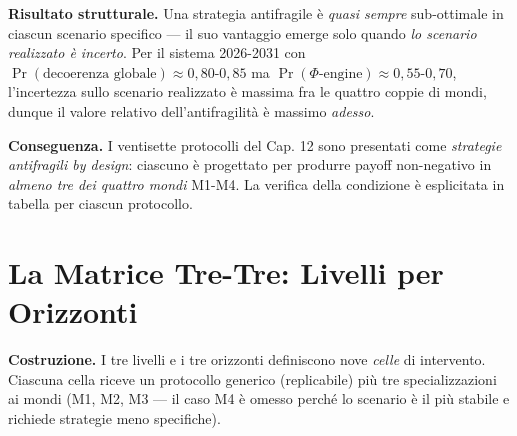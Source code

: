 \Proved{} \textbf{Risultato strutturale.} Una strategia antifragile è
\emph{quasi sempre} sub-ottimale in ciascun scenario specifico --- il
suo vantaggio emerge solo quando \emph{lo scenario realizzato è
incerto}. Per il sistema 2026-2031 con
\(\Pr(\text{decoerenza globale}) \approx 0{,}80\)-\(0{,}85\) ma
\(\Pr(\Phi\text{-engine}) \approx 0{,}55\)-\(0{,}70\), l'incertezza
sullo scenario realizzato è massima fra le quattro coppie di mondi,
dunque il valore relativo dell'antifragilità è massimo \emph{adesso}.

\Hypoth{} \textbf{Conseguenza.} I ventisette protocolli del Cap. 12 sono
presentati come \emph{strategie antifragili by design}: ciascuno è
progettato per produrre payoff non-negativo in \emph{almeno tre dei
quattro mondi} M1-M4. La verifica della condizione è esplicitata in
tabella per ciascun protocollo.



\section{La Matrice Tre-Tre: Livelli per
Orizzonti}\label{la-matrice-tre-tre-livelli-per-orizzonti}

\Hypoth{} \textbf{Costruzione.} I tre livelli e i tre orizzonti
definiscono nove \emph{celle} di intervento. Ciascuna cella riceve un
protocollo generico (replicabile) più tre specializzazioni ai mondi (M1,
M2, M3 --- il caso M4 è omesso perché lo scenario è il più stabile e
richiede strategie meno specifiche).

